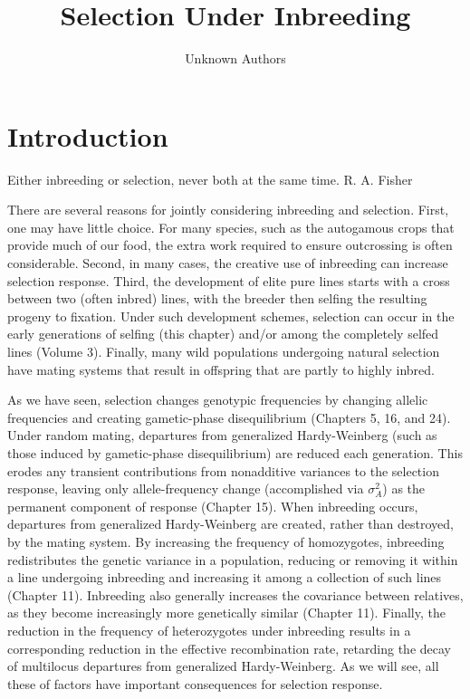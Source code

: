 \documentclass{article}
\title{Selection Under Inbreeding}
\author{Unknown Authors}
\date{}
\begin{document}
\maketitle

\begin{abstract}

\end{abstract}

\section{Introduction}
Either inbreeding or selection, never both at the same time. R. A. Fisher

There are several reasons for jointly considering inbreeding and selection. First, one may have little choice. For many species, such as the autogamous crops that provide much of our food, the extra work required to ensure outcrossing is often considerable. Second, in many cases, the creative use of inbreeding can increase selection response. Third, the development of elite pure lines starts with a cross between two (often inbred) lines, with the breeder then selfing the resulting progeny to fixation. Under such development schemes, selection can occur in the early generations of selfing (this chapter) and/or among the completely selfed lines (Volume 3). Finally, many wild populations undergoing natural selection have mating systems that result in offspring that are partly to highly inbred.

As we have seen, selection changes genotypic frequencies by changing allelic frequencies and creating gametic-phase disequilibrium (Chapters 5, 16, and 24). Under random mating, departures from generalized Hardy-Weinberg (such as those induced by gametic-phase disequilibrium) are reduced each generation. This erodes any transient contributions from nonadditive variances to the selection response, leaving only allele-frequency change (accomplished via  $ \sigma_{A}^{2} $) as the permanent component of response (Chapter 15). When inbreeding occurs, departures from generalized Hardy-Weinberg are created, rather than destroyed, by the mating system. By increasing the frequency of homozygotes, inbreeding redistributes the genetic variance in a population, reducing or removing it within a line undergoing inbreeding and increasing it among a collection of such lines (Chapter 11). Inbreeding also generally increases the covariance between relatives, as they become increasingly more genetically similar (Chapter 11). Finally, the reduction in the frequency of heterozygotes under inbreeding results in a corresponding reduction in the effective recombination rate, retarding the decay of multilocus departures from generalized Hardy-Weinberg. As we will see, all these of factors have important consequences for selection response.
\end{document}
